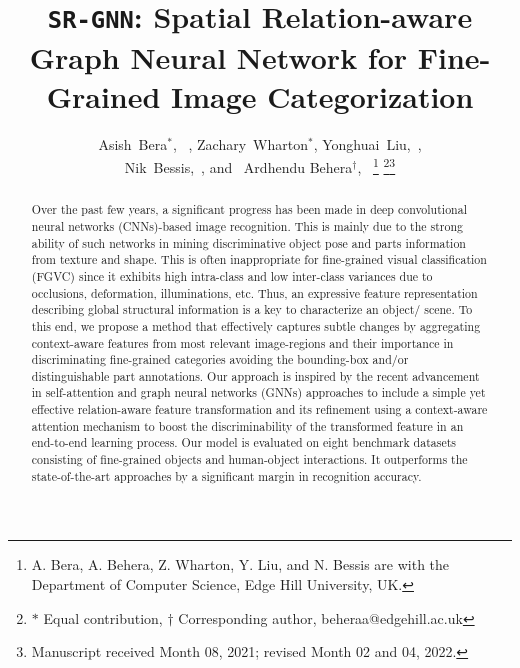 \documentclass[journal]{IEEEtran}
\begin{document}
\title{\texttt{SR-GNN}: Spatial Relation-aware Graph Neural Network for Fine-Grained Image Categorization}
\author{Asish~Bera$^*$, ~,
        Zachary~Wharton$^*$, 
        Yonghuai~Liu,~, \\
        Nik~Bessis,~,
        and
        ~Ardhendu Behera$^\dagger$,~
\thanks{A. Bera, A. Behera, Z. Wharton, Y. Liu, and N. Bessis   are with the Department of Computer Science, Edge Hill University, UK.}
\thanks{$*$ Equal contribution, $\dagger$ Corresponding author, beheraa@edgehill.ac.uk}\thanks{Manuscript received Month 08, 2021; revised Month 02 and 04, 2022.}}

\maketitle
\begin{abstract}
Over the past few years, a significant progress has been made in deep convolutional neural networks (CNNs)-based image recognition. This is mainly due to the strong ability of such networks in mining discriminative object pose and parts information from texture and shape. This is often inappropriate for fine-grained visual classification (FGVC) since it exhibits high intra-class and low inter-class variances due to occlusions, deformation, illuminations, etc. Thus, an expressive feature representation describing global structural information is a key to characterize an object/ scene. To this end, we propose a method that effectively captures subtle changes by aggregating context-aware features from most relevant image-regions and their importance in discriminating fine-grained categories avoiding the bounding-box and/or distinguishable part annotations. Our approach is inspired by the recent advancement in self-attention and graph neural networks (GNNs) approaches to include a simple yet effective relation-aware feature transformation and its refinement using a context-aware attention mechanism to boost the discriminability of the transformed feature in an end-to-end learning process. Our model is evaluated on eight benchmark datasets consisting of fine-grained objects and human-object interactions. It outperforms the state-of-the-art approaches by a significant margin in recognition accuracy.
\end{abstract}
\end{document}
